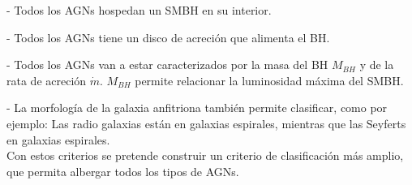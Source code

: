 


- Todos los AGNs hospedan un SMBH en su interior. 

- Todos los AGNs tiene un disco de acreción que alimenta el BH.

- Todos los AGNs van a estar caracterizados por la masa del BH $M_{BH}$ y de la rata de acreción $\dot{m}$. $M_{BH}$ permite relacionar la luminosidad máxima del SMBH. 

- La morfología de la galaxia anfitriona también permite clasificar, como por ejemplo: Las radio galaxias están en galaxias espirales, mientras que las Seyferts en galaxias espirales.\\

Con estos criterios se pretende construir un criterio de clasificación más amplio, que permita albergar todos los tipos de AGNs. 





